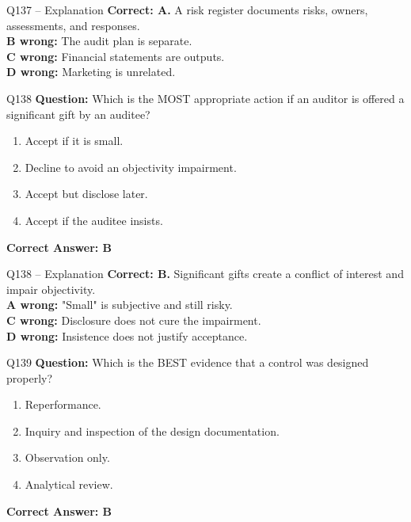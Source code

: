 \documentclass[aspectratio=169,10pt]{beamer}
\begin{document}
	\begin{frame}[t]{Q137 -- Explanation}
		\small
		\textbf{Correct: A.} A risk register documents risks, owners, assessments, and responses. \\[4pt]
		\textbf{B wrong:} The audit plan is separate. \\[2pt]
		\textbf{C wrong:} Financial statements are outputs. \\[2pt]
		\textbf{D wrong:} Marketing is unrelated.
	\end{frame}
	
	\begin{frame}[t]{Q138}
		\small
		\textbf{Question:} Which is the MOST appropriate action if an auditor is offered a significant gift by an auditee?
		\begin{enumerate}[label=\Alph*.,itemsep=1pt,topsep=2pt]
			\item Accept if it is small.
			\item Decline to avoid an objectivity impairment.
			\item Accept but disclose later.
			\item Accept if the auditee insists.
		\end{enumerate}
		\vspace{4pt}
		\textbf{Correct Answer: B}
	\end{frame}
	
	\begin{frame}[t]{Q138 -- Explanation}
		\small
		\textbf{Correct: B.} Significant gifts create a conflict of interest and impair objectivity. \\[4pt]
		\textbf{A wrong:} "Small" is subjective and still risky. \\[2pt]
		\textbf{C wrong:} Disclosure does not cure the impairment. \\[2pt]
		\textbf{D wrong:} Insistence does not justify acceptance.
	\end{frame}
	
	\begin{frame}[t]{Q139}
		\small
		\textbf{Question:} Which is the BEST evidence that a control was designed properly?
		\begin{enumerate}[label=\Alph*.,itemsep=1pt,topsep=2pt]
			\item Reperformance.
			\item Inquiry and inspection of the design documentation.
			\item Observation only.
			\item Analytical review.
		\end{enumerate}
		\vspace{4pt}
		\textbf{Correct Answer: B}
	\end{frame}
	
\end{document}
